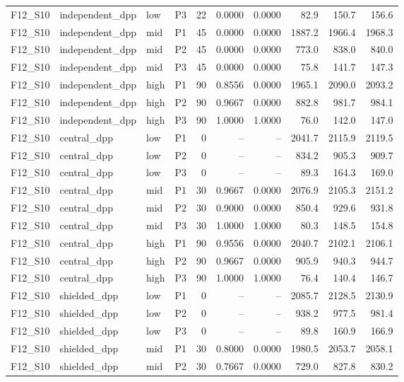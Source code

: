 \begin{longtable}{llllrrrrrr}
F12\_S10 & independent\_dpp & low & P3 & 22 & 0.0000 & 0.0000 & 82.9 & 150.7 & 156.6 \\
F12\_S10 & independent\_dpp & mid & P1 & 45 & 0.0000 & 0.0000 & 1887.2 & 1966.4 & 1968.3 \\
F12\_S10 & independent\_dpp & mid & P2 & 45 & 0.0000 & 0.0000 & 773.0 & 838.0 & 840.0 \\
F12\_S10 & independent\_dpp & mid & P3 & 45 & 0.0000 & 0.0000 & 75.8 & 141.7 & 147.3 \\
F12\_S10 & independent\_dpp & high & P1 & 90 & 0.8556 & 0.0000 & 1965.1 & 2090.0 & 2093.2 \\
F12\_S10 & independent\_dpp & high & P2 & 90 & 0.9667 & 0.0000 & 882.8 & 981.7 & 984.1 \\
F12\_S10 & independent\_dpp & high & P3 & 90 & 1.0000 & 1.0000 & 76.0 & 142.0 & 147.0 \\
F12\_S10 & central\_dpp & low & P1 & 0 & -- & -- & 2041.7 & 2115.9 & 2119.5 \\
F12\_S10 & central\_dpp & low & P2 & 0 & -- & -- & 834.2 & 905.3 & 909.7 \\
F12\_S10 & central\_dpp & low & P3 & 0 & -- & -- & 89.3 & 164.3 & 169.0 \\
F12\_S10 & central\_dpp & mid & P1 & 30 & 0.9667 & 0.0000 & 2076.9 & 2105.3 & 2151.2 \\
F12\_S10 & central\_dpp & mid & P2 & 30 & 0.9000 & 0.0000 & 850.4 & 929.6 & 931.8 \\
F12\_S10 & central\_dpp & mid & P3 & 30 & 1.0000 & 1.0000 & 80.3 & 148.5 & 154.8 \\
F12\_S10 & central\_dpp & high & P1 & 90 & 0.9556 & 0.0000 & 2040.7 & 2102.1 & 2106.1 \\
F12\_S10 & central\_dpp & high & P2 & 90 & 0.9667 & 0.0000 & 905.9 & 940.3 & 944.7 \\
F12\_S10 & central\_dpp & high & P3 & 90 & 1.0000 & 1.0000 & 76.4 & 140.4 & 146.7 \\
F12\_S10 & shielded\_dpp & low & P1 & 0 & -- & -- & 2085.7 & 2128.5 & 2130.9 \\
F12\_S10 & shielded\_dpp & low & P2 & 0 & -- & -- & 938.2 & 977.5 & 981.4 \\
F12\_S10 & shielded\_dpp & low & P3 & 0 & -- & -- & 89.8 & 160.9 & 166.9 \\
F12\_S10 & shielded\_dpp & mid & P1 & 30 & 0.8000 & 0.0000 & 1980.5 & 2053.7 & 2058.1 \\
F12\_S10 & shielded\_dpp & mid & P2 & 30 & 0.7667 & 0.0000 & 729.0 & 827.8 & 830.2 \\

\end{longtable}
